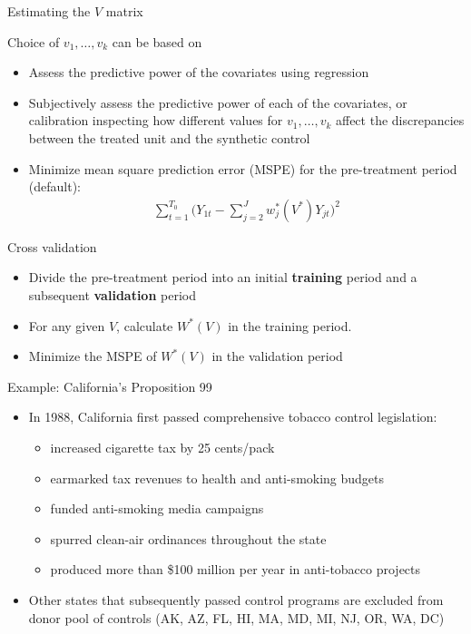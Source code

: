 \documentclass{beamer}
\begin{document}
\begin{frame}{Estimating the $V$ matrix}
	
 Choice of $v_1, \dots, v_k$ can be based on
		\begin{itemize}
		\item Assess the predictive power of the covariates using regression
		\item Subjectively assess the predictive power of each of the covariates, or calibration inspecting how different values for $v_1, \dots, v_k$ affect the discrepancies between the treated unit and the synthetic control
		\item Minimize mean square prediction error (MSPE) for the pre-treatment period (default):
			\begin{eqnarray*}
			\sum_{t=1}^{T_0} \bigg(Y_{1t} - \sum_{j=2}^J w_j^*(V^*)Y_{jt} \bigg)^2
			\end{eqnarray*}
		\end{itemize}
\end{frame}

\begin{frame}{Cross validation}

\begin{itemize}
		\item Divide the pre-treatment period into an initial \textbf{training} period and a subsequent \textbf{validation} period
		\item For any given $V$, calculate $W^*(V)$ in the training period.
		\item Minimize the MSPE of $W^*(V)$ in the validation period
\end{itemize}

\end{frame}



\begin{frame}{Example: California's Proposition 99}
	
	\begin{itemize}
	\item In 1988, California first passed comprehensive tobacco control legislation:
		\begin{itemize}
		\item increased cigarette tax by 25 cents/pack
		\item earmarked tax revenues to health and anti-smoking budgets
		\item funded anti-smoking media campaigns
		\item spurred clean-air ordinances throughout the state
		\item produced more than \$100 million per year in anti-tobacco projects
		\end{itemize}
	\item Other states that subsequently passed control programs are excluded from donor pool of controls (AK, AZ, FL, HI, MA, MD, MI, NJ, OR, WA, DC)
	\end{itemize}
\end{frame}
\end{document}

